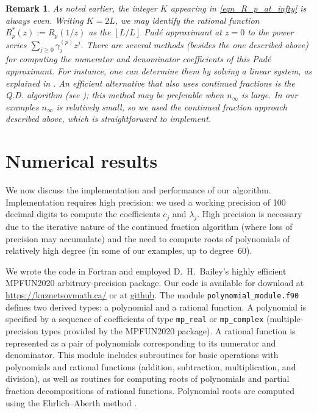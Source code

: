 \documentclass[12pt]{article}
\newtheorem{remark}{Remark}
\begin{document}
\begin{remark}
\textnormal{
As noted earlier, the integer $K$ appearing in \eqref{eqn_R_p_at_infty} is always even. Writing $K=2L$, we may identify the rational function $R^*_p(z):=R_p(1/z)$ as the $[L/L]$ Pad\'e approximant at $z=0$ to the power series 
$\sum_{j\ge 0} \gamma^{(p)}_j z^j$.  There are several methods (besides the one described above) for computing the numerator and denominator coefficients of this Pad\'e approximant. For instance, one can determine them by solving a linear system, as explained in \cite[Section~2.3]{Baker1981}. An efficient alternative that also uses continued fractions is the Q.D. algorithm (see \cite[Section~4.3]{Baker1981}); this method may be preferable when $n_{\infty}$ is large. In our examples $n_{\infty}$ is relatively small, so we used the continued fraction approach described above, which is straightforward to implement.}
\end{remark}




\section{Numerical results}\label{section_Numerical_results}




We now discuss the implementation and performance of our algorithm.  
Implementation requires high precision: we used a working precision of 100 decimal digits to compute the coefficients $c_j$ and $\lambda_j$. High precision is necessary due to the iterative nature of the continued fraction algorithm (where loss of precision may accumulate) and the need to compute roots of polynomials of relatively high degree (in some of our examples, up to degree~60).  

We wrote the code in Fortran and employed D.~H.~Bailey’s highly efficient MPFUN2020 \cite{Bailey_2020} arbitrary-precision package. Our code is available for download at \url{https://kuznetsovmath.ca/} or at  \href{https://github.com/Alexey-Kuznetsov-math/exponential_sum_approximations}{github}. The module {\texttt{polynomial\_module.f90}} defines two derived types: a polynomial and a rational function. A polynomial is specified by a sequence of coefficients of type {\texttt{mp\_real}} or {\texttt{mp\_complex}} (multiple-precision types provided by the MPFUN2020 package). A rational function is represented as a pair of polynomials corresponding to its numerator and denominator. This module includes subroutines for basic operations with polynomials and rational functions (addition, subtraction, multiplication, and division), as well as routines for computing roots of polynomials and partial fraction decompositions of rational functions. Polynomial roots are computed using the Ehrlich–Aberth method \cite{Aberth_1973,Ehrlich_1967}.  
\end{document}
